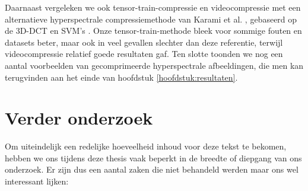 Daarnaast vergeleken we ook tensor-train-compressie en videocompressie met een alternatieve hyperspectrale compressiemethode van Karami et al. \cite{ref:karami}, gebaseerd op de 3D-DCT \cite{ref:dct} en SVM's \cite{ref:svm}. Onze tensor-train-methode bleek voor sommige fouten en datasets beter, maar ook in veel gevallen slechter dan deze referentie, terwijl videocompressie relatief goede resultaten gaf. Ten slotte toonden we nog een aantal voorbeelden van gecomprimeerde hyperspectrale afbeeldingen, die men kan terugvinden aan het einde van hoofdstuk \ref{hoofdstuk:resultaten}.

\newpage
\section{Verder onderzoek}

Om uiteindelijk een redelijke hoeveelheid inhoud voor deze tekst te bekomen, hebben we ons tijdens deze thesis vaak beperkt in de breedte of diepgang van ons onderzoek. Er zijn dus een aantal zaken die niet behandeld werden maar ons wel interessant lijken:

